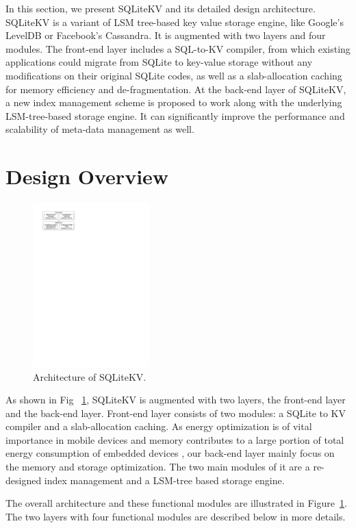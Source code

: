 In this section, we present SQLiteKV and its detailed design architecture. SQLiteKV is a variant of LSM tree-based key value storage engine, like Google's LevelDB or Facebook's Cassandra. It is augmented with two layers and four modules. The front-end layer includes a SQL-to-KV compiler, from which existing applications could migrate from SQLite to key-value storage without any modifications on their original SQLite codes, as well as a slab-allocation caching for memory efficiency and de-fragmentation. At the back-end layer of SQLiteKV, a new index management scheme is proposed to work along with the underlying LSM-tree-based storage engine. It can significantly improve the performance and scalability of meta-data management as well. 

\section{Design Overview}
\begin{figure}[h]
	\centering
	\includegraphics[width=0.4\textwidth]{pic/SQLiteKV.pdf}
	\caption{Architecture of SQLiteKV.}
	\label{fig:SQLiteKV}
	\centering
\end{figure}
As shown in Fig ~\ref{fig:SQLiteKV}, SQLiteKV is augmented with two layers, the front-end layer and the back-end layer. Front-end layer consists of two modules: a SQLite to KV compiler and a slab-allocation caching. As energy optimization is of vital importance in mobile devices and memory contributes to a large portion of total energy consumption of embedded devices \cite{shao2012utilizing},  our back-end layer  mainly focus on the memory and storage optimization. The two main modules of it are a re-designed index management and a LSM-tree based storage engine. 

The overall architecture and these functional modules are illustrated in Figure~\ref{fig:SQLiteKV}.  The two layers with four functional modules are described below in more details.

